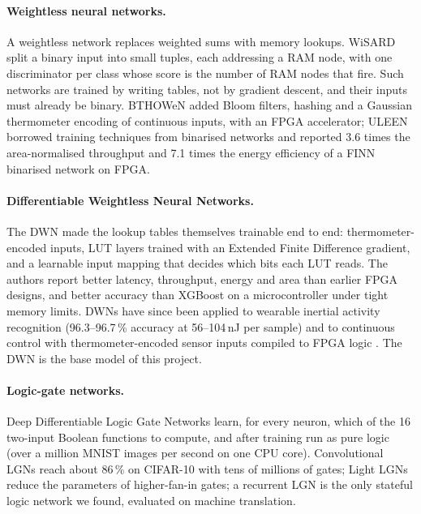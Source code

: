 \paragraph{Weightless neural networks.} A weightless network replaces weighted sums with memory lookups. WiSARD
\cite{aleksander1984wisard} split a binary input into small tuples, each addressing a RAM node, with one discriminator
per class whose score is the number of RAM nodes that fire. Such networks are trained by writing tables, not by
gradient descent, and their inputs must already be binary. BTHOWeN \cite{susskind2022bthowen} added Bloom filters,
hashing and a Gaussian thermometer encoding of continuous inputs, with an FPGA accelerator; ULEEN
\cite{susskind2023uleen} borrowed training techniques from binarised networks and reported 3.6 times the
area-normalised throughput and 7.1 times the energy efficiency of a FINN binarised network on FPGA.

\paragraph{Differentiable Weightless Neural Networks.} The DWN \cite{bacellar2024dwn} made the lookup tables
themselves trainable end to end: thermometer-encoded inputs, LUT layers trained with an Extended Finite Difference
gradient, and a learnable input mapping that decides which bits each LUT reads. The authors report better latency,
throughput, energy and area than earlier FPGA designs, and better accuracy than XGBoost on a microcontroller under
tight memory limits. DWNs have since been applied to wearable inertial activity recognition \cite{bacellar2025nanoml}
(96.3--96.7\,\% accuracy at 56--104\,nJ per sample) and to continuous control with thermometer-encoded sensor inputs
compiled to FPGA logic \cite{kresse2025dwc}. The DWN is the base model of this project.

\paragraph{Logic-gate networks.} Deep Differentiable Logic Gate Networks \cite{petersen2022dlgn} learn, for every
neuron, which of the 16 two-input Boolean functions to compute, and after training run as pure logic (over a million
MNIST images per second on one CPU core). Convolutional LGNs \cite{petersen2024convdlgn} reach about 86\,\% on
CIFAR-10 with tens of millions of gates; Light LGNs \cite{ruttgers2026lightdlgn} reduce the parameters of
higher-fan-in gates; a recurrent LGN \cite{buhrer2025rdlgn} is the only stateful logic network we found, evaluated on
machine translation.


